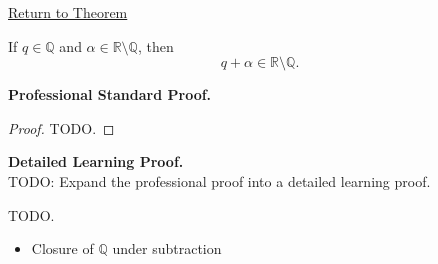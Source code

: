 \newpage
{}
\label{prf:rational-plus-irrational-is-irrational}

\begin{remark*}[Return]
\hyperref[thm:rational-plus-irrational-is-irrational]{Return to Theorem}
\end{remark*}

\begin{theorem*}
If $q\in\mathbb{Q}$ and $\alpha\in\mathbb{R}\setminus\mathbb{Q}$, then
\[
q+\alpha\in\mathbb{R}\setminus\mathbb{Q}.
\]
\end{theorem*}

\textbf{Professional Standard Proof.}~\\
\begin{proof}
TODO.
\end{proof}

\textbf{Detailed Learning Proof.}~\\
TODO: Expand the professional proof into a detailed learning proof.


\begin{remark*}
TODO.
\end{remark*}

\begin{dependencies}
\begin{itemize}
  \item Closure of $\mathbb{Q}$ under subtraction
\end{itemize}
\end{dependencies}

